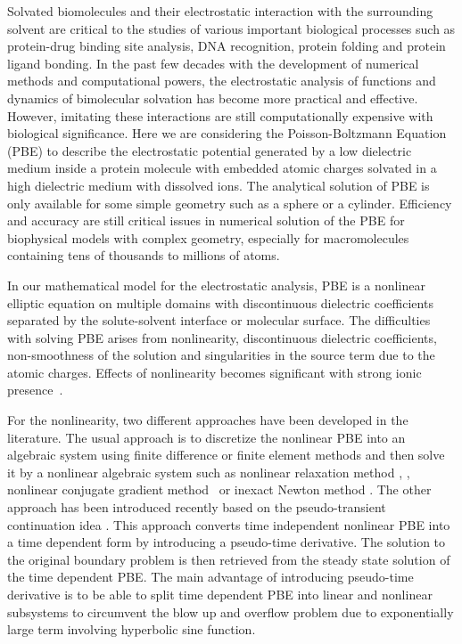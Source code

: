 Solvated biomolecules and their electrostatic interaction with the surrounding solvent are critical to the studies of various important biological processes such as protein-drug binding site analysis, DNA recognition, protein folding and protein ligand bonding. In the past few decades with the development of numerical methods and computational powers, the electrostatic analysis of functions and dynamics of bimolecular solvation has become more practical and effective. However, imitating these interactions are still computationally expensive with biological significance. Here we are considering the Poisson-Boltzmann Equation (PBE)  to describe the electrostatic potential generated by a low dielectric medium inside a protein molecule with embedded atomic charges solvated in a high dielectric medium with dissolved ions. The analytical solution of PBE is only available for some simple geometry such as a sphere or a cylinder. Efficiency and accuracy are still critical issues in numerical solution of the PBE for biophysical models with complex geometry, especially for macromolecules  containing tens of thousands to millions of atoms. 

 In our mathematical model for the electrostatic analysis, PBE is a nonlinear elliptic equation on multiple domains with discontinuous dielectric coefficients separated  by the solute-solvent interface or molecular surface. The difficulties with solving PBE arises from nonlinearity, discontinuous dielectric coefficients, non-smoothness of the solution and singularities in the source term due to the atomic charges. Effects of nonlinearity becomes significant with strong ionic presence~\cite{Wilson2016}. 


For the nonlinearity, two different approaches have been developed in the literature. The usual approach is to discretize the nonlinear PBE into an algebraic system using finite difference or finite element methods and then solve it by a nonlinear algebraic system such as nonlinear relaxation method \cite{Im1998}, \cite{Rocchia2001}, nonlinear conjugate gradient method~\cite{Luty1992} or inexact Newton method \cite{Holst1995}. The other approach has been introduced recently based on the  pseudo-transient continuation idea \cite{Shestakov2002,Sayyed-Ahmad2004,Zhao2011}. This approach converts time independent nonlinear PBE into a time dependent form by introducing a pseudo-time derivative. The solution to the original boundary problem is then retrieved from the steady state solution of the time dependent PBE. The main advantage of introducing pseudo-time derivative is to be able to split time dependent PBE into linear and nonlinear subsystems to circumvent the blow up and overflow problem due to exponentially large term involving hyperbolic sine function. 

